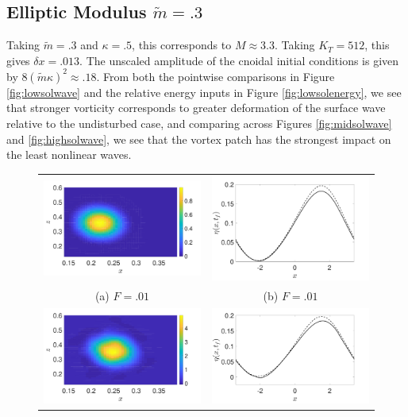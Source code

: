 \documentclass[a4paper,11pt]{article}
\begin{document}
\subsection*{Elliptic Modulus $\tilde{m}=.3$}
Taking $\tilde{m}=.3$ and $\kappa = .5$, this corresponds to $M \approx 3.3$.  Taking $K_{T}=512$, this gives $\delta x = .013$.  The unscaled amplitude of the cnoidal initial conditions is given by $8(\tilde{m}\kappa)^{2}\approx .18$.  From both the pointwise comparisons in Figure \ref{fig:lowsolwave} and the relative energy inputs in Figure \ref{fig:lowsolenergy}, we see that stronger vorticity corresponds to greater deformation of the surface wave relative to the undisturbed case, and comparing across Figures \ref{fig:midsolwave} and \ref{fig:highsolwave}, we see that the vortex patch has the strongest impact on the least nonlinear waves.  
\begin{figure}
\centering
\begin{tabular}{cc}
\includegraphics[width=.45\textwidth]{vorticity_wm_1_modu_pt3} & \includegraphics[width=.45\textwidth]{profiles_wm_1_modu_pt3}\\
(a)  $F=.01$ & (b)  $F=.01$\\
\includegraphics[width=.45\textwidth]{vorticity_wm_5_modu_pt3} & \includegraphics[width=.45\textwidth]{profiles_wm_5_modu_pt3}\\

\end{tabular}
\end{figure}
\end{document}
